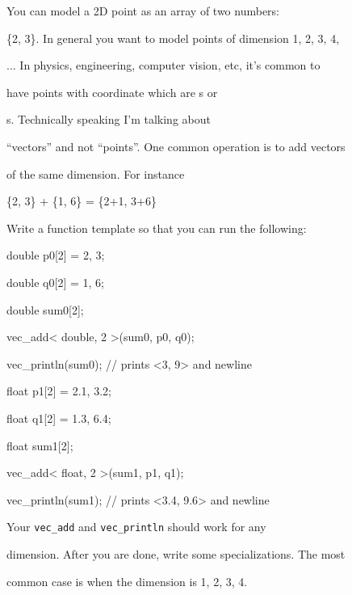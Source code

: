 You can model a 2D point as an array of two numbers:

\{2, 3\}. In general you want to model points of dimension 1, 2, 3, 4,

... In physics, engineering, computer vision, etc, it's common to

have points with coordinate which are s or

s. Technically speaking I'm talking about

``vectors'' and not ``points''. One common operation is to add vectors

of the same dimension. For instance

\begin{center}

\{2, 3\} + \{1, 6\} = \{2+1, 3+6\}

\end{center}

Write a function template so that you can run the following:



\begin{consolethree}[escapeinside=||]

double p0[2] = {2, 3};

double q0[2] = {1, 6};

double sum0[2];

vec_add< double, 2 >(sum0, p0, q0);

vec_println(sum0); // prints <3, 9> and newline



float p1[2] = {2.1, 3.2};

float q1[2] = {1.3, 6.4};

float sum1[2];

vec_add< float, 2 >(sum1, p1, q1);

vec_println(sum1); // prints <3.4, 9.6> and newline

\end{consolethree}



Your \texttt{vec\_add} and \texttt{vec\_println} should work for any

dimension. After you are done, write some specializations. The most

common case is when the dimension is 1, 2, 3, 4.

